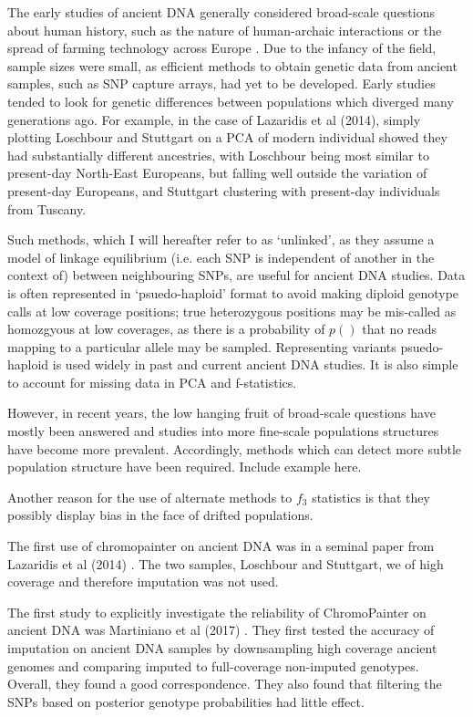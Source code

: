 {The early studies of ancient DNA generally considered broad-scale questions about human history, such as the nature of human-archaic interactions or the spread of farming technology across Europe \cite{Lazaridis2014}. Due to the infancy of the field, sample sizes were small, as efficient methods to obtain genetic data from ancient samples, such as SNP capture arrays, had yet to be developed. Early studies tended to look for genetic differences between populations which diverged many generations ago. For example, in the case of Lazaridis et al (2014), simply plotting Loschbour and Stuttgart on a PCA of modern individual showed they had substantially different ancestries, with Loschbour being most similar to present-day North-East Europeans, but falling well outside the variation of present-day Europeans, and Stuttgart clustering with present-day individuals from Tuscany. 

Such methods, which I will hereafter refer to as `unlinked', as they assume a model of linkage equilibrium (i.e. each SNP is independent of another in the context of) between neighbouring SNPs, are useful for ancient DNA studies.  Data is often represented in `psuedo-haploid' format to avoid making diploid genotype calls at low coverage positions; true heterozygous positions may be mis-called as homozgyous at low coverages, as there is a probability of $p()$ that no reads mapping to a particular allele may be sampled. Representing variants psuedo-haploid is used widely in past and current ancient DNA studies. It is also simple to account for missing data in PCA and f-statistics.    

However, in recent years, the low hanging fruit of broad-scale questions have mostly been answered and studies into more fine-scale populations structures have become more prevalent. Accordingly, methods which can detect more subtle population structure have been required. Include example here. 


Another reason for the use of alternate methods to $f_{3}$ statistics is that they possibly display bias in the face of drifted populations. 


The first use of chromopainter on ancient DNA was in a seminal paper from Lazaridis et al (2014) \cite{Lazaridis2014}. The two samples, Loschbour and Stuttgart, we of high coverage and therefore imputation was not used.

The first study to explicitly investigate the reliability of ChromoPainter on ancient DNA was Martiniano et al (2017) \cite{Martiniano2017}. They first tested the accuracy of imputation on ancient DNA samples by downsampling high coverage ancient genomes and comparing imputed to full-coverage non-imputed genotypes. Overall, they found a good correspondence. They also found that filtering the SNPs based on posterior genotype probabilities had little effect. 

}
